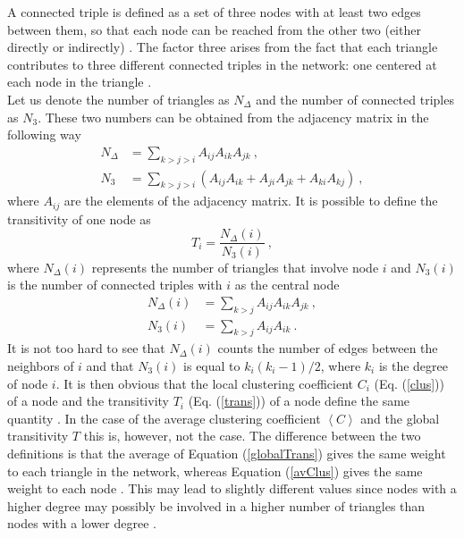\documentclass[11 pt , letterpaper , twoside , openright]{book}
\begin{document}
\newline
A connected triple is defined as a set of three nodes with at least two edges between them, so that each node can be reached from the other two (either directly or indirectly) \cite{Newman2003}. The factor three arises from the fact that each triangle contributes to three different connected triples in the network: one centered at each node in the triangle \cite{F.Costa2007}. \\
Let us denote the number of triangles as $N_{\Delta}$ and the number of connected triples as $N_3$. These two numbers can be obtained from the adjacency matrix in the following way \cite{F.Costa2007}
\begin{align}
	N_{\Delta} &= \sum_{k > j > i} A_{ij}A_{ik}A_{jk} \ , \\
	N_3 &= \sum_{k > j > i} (A_{ij}A_{ik} + A_{ji}A_{jk} + A_{ki}A_{kj}) \ ,
\end{align}
where $A_{ij}$ are the elements of the adjacency matrix. It is possible to define the transitivity of one node as \cite{F.Costa2007}
\begin{equation}\label{trans}
	T_i = \frac{N_{\Delta}(i)}{N_3(i)} \ ,
\end{equation}
where $N_{\Delta}(i)$ represents the number of triangles that involve node $i$ and $N_3(i)$ is the number of connected triples with $i$ as the central node \cite{F.Costa2007}
\begin{align}
	N_{\Delta}(i) &= \sum_{k > j} A_{ij}A_{ik}A_{jk} \ , \\
	N_3(i) &= \sum_{k > j} A_{ij}A_{ik} \ .
\end{align}
It is not too hard to see that $N_{\Delta}(i)$ counts the number of edges between the neighbors of $i$ and that $N_3(i)$ is equal to $k_i(k_i-1)/2$, where $k_i$ is the degree of node $i$. It is then obvious that the local clustering coefficient $C_i$ (Eq. (\ref{clus})) of a node and the transitivity $T_i$ (Eq. (\ref{trans})) of a node define the same quantity \cite{F.Costa2007}. In the case of the average clustering coefficient $\left<C\right>$ and the global transitivity $T$ this is, however, not the case. The difference between the two definitions is that the average of Equation (\ref{globalTrans}) gives the same weight to each triangle in the network, whereas Equation (\ref{avClus}) gives the same weight to each node \cite{Newman2003}. This may lead to slightly different values since nodes with a higher degree may possibly be involved in a higher number of triangles than nodes with a lower degree \cite{F.Costa2007}.
	
\end{document}
